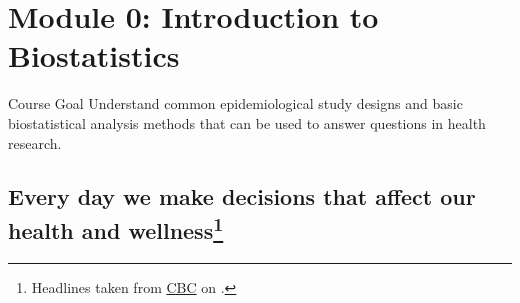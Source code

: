 \setcounter{section}{-1}
\section{Module 0: Introduction to Biostatistics}
\begin{Regular}{Course Goal}
    Understand common epidemiological study designs and basic biostatistical analysis
    methods that can be used to answer questions in health research.
\end{Regular}
\subsection*{Every day we make decisions that affect our health and wellness\footnote{Headlines taken from \href{http://www.cbc.ca/news/health}{CBC} on .}}%
